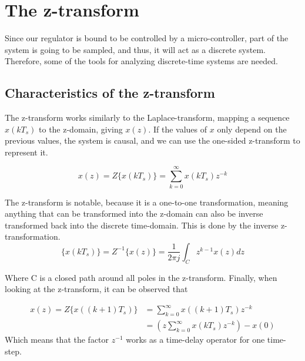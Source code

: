 \chapter{The z-transform}
Since our regulator is bound to be controlled by a micro-controller, part of the system is going to be sampled, and thus, it will act as a discrete system. Therefore, some of the tools for analyzing discrete-time systems are needed. 
\label{chp:z_transform}
\section{Characteristics of the z-transform}

The z-transform works similarly to the Laplace-transform, mapping a sequence $x(k T_s)$ to the z-domain, giving $x(z)$. If the values of $x$ only depend on the previous values, the system is causal, and we can use the one-sided z-transform to represent it. 

\begin{equation}
 x(z) = Z\{ x(k T_s) \} = \sum_{k=0}^\infty x(k T_s) z^{-k}
\end{equation}{}

The z-transform is notable, because it is a one-to-one transformation, meaning anything that can be transformed into the z-domain can also be inverse transformed back into the discrete time-domain. This is done by the inverse z-transformation. 
\begin{equation}
 \{x(k T_s)\} = Z^{-1}\{ x(z) \} = \frac{1}{2 \pi j} \int_C z^{k-1} x(z) dz
\end{equation}{}

Where C is a closed path around all poles in the z-transform. 
Finally, when looking at the z-transform, it can be observed that

\begin{align}
 x(z) = Z\{ x((k+1) T_s) \} &= \sum_{k=0}^\infty x((k+1) T_s) z^{-k}\\
 &= (z\sum_{k=0}^\infty x(k T_s) z^{-k}) -x(0)
\end{align}
Which means that the factor $z^{-1}$ works as a time-delay operator for one time-step. 

